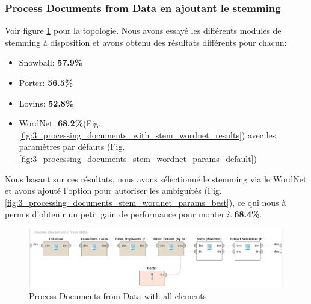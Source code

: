 \documentclass[a4paper]{article}
\begin{document}
\vspace{6pt}
\subsubsection{Process Documents from Data en ajoutant le stemming}
Voir figure \ref{fig:3_processing_documents_full} pour la topologie. Nous avons essayé les différents modules de stemming à disposition et avons obtenu des résultats différents pour chacun:
\begin{itemize}
	\item Snowball: \textbf{57.9\%}
	\item Porter: \textbf{56.5\%}
	\item Lovins: \textbf{52.8\%}
	\item WordNet: \textbf{68.2\%}(Fig.\ref{fig:3_processing_documents_with_stem_wordnet_results}) avec les paramètres par défauts (Fig.\ref{fig:3_processing_documents_stem_wordnet_params_default})
\end{itemize}
\vspace{6pt}
Nous basant sur ces résultats, nous avons sélectionné le stemming via le WordNet et avons ajouté l'option pour autoriser les ambiguïtés (Fig.\ref{fig:3_processing_documents_stem_wordnet_params_best}), ce qui nous à permis d'obtenir un petit gain de performance pour monter à \textbf{68.4\%}.

\begin{figure}[H]
	\includegraphics[width=\linewidth]{imgs/part_3/3_processing_documents_full}
	\caption{Process Documents from Data with all elements}
	\label{fig:3_processing_documents_full}
\end{figure}
\end{document}
